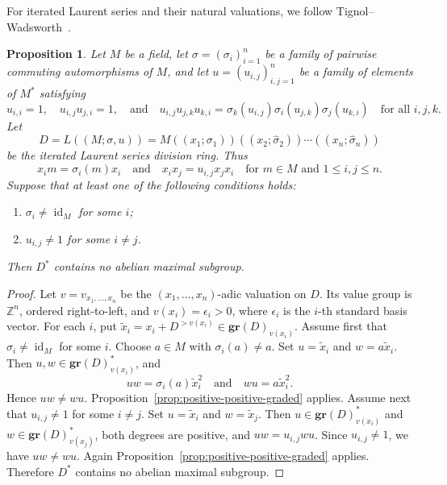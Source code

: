 \documentclass[11pt]{amsart}
\newtheorem{proposition}[theorem]{Proposition}
\theoremstyle{definition}
\begin{document}
For iterated Laurent series and their natural valuations, we follow
Tignol--Wadsworth~\cite[§1.1.3, pp.~5--7]{TW}.

\begin{proposition}
\label{prop:iterated-laurent}
Let $M$ be a field, let $\sigma=(\sigma_i)^n_{i=1}$ be a family of pairwise
commuting automorphisms of $M$, and let $u=(u_{i,j})^n_{i,j=1}$ be a family
of elements of $M^*$ satisfying
$$
        u_{i,i}=1,\quad u_{i,j}u_{j,i}=1,\quad\text{and}\quad
        u_{i,j}u_{j,k}u_{k,i}
        =
        \sigma_k(u_{i,j})\sigma_i(u_{j,k})\sigma_j(u_{k,i})
        \quad\text{for all } i,j,k.
$$
Let
\[
        D=L((M;\sigma,u))
        =
        M((x_1;\sigma_1))((x_2;\widehat\sigma_2))\cdots
        ((x_n;\widehat\sigma_n))
\]
be the iterated Laurent series division ring.  Thus
$$
        x_i m=\sigma_i(m)x_i\quad\text{and}\quad x_i x_j=u_{i,j}x_jx_i
        \quad\text{for } m\in M \text{ and } 1\leq i,j\leq n.
$$  Suppose that at least one of the
following conditions holds:
\begin{enumerate}[label=\textup{(\arabic*)}]
        \item $\sigma_i\ne\operatorname{id}_M$ for some $i$;
        \item $u_{i,j}\ne 1$ for some $i\ne j$.
\end{enumerate}
Then $D^*$ contains no abelian maximal subgroup.
\end{proposition}

\begin{proof}
Let $v=v_{x_1,\ldots,x_n}$ be the $(x_1,\ldots,x_n)$-adic valuation on $D$.
Its value group is $\mathbb Z^n$, ordered right-to-left, and
$v(x_i)=\epsilon_i>0$, where $\epsilon_i$ is the $i$-th standard basis vector.
For each $i$, put
$\widetilde x_i=x_i+D^{>v(x_i)}\in \mathbf{gr}(D)_{v(x_i)}$.
Assume first that $\sigma_i\ne\operatorname{id}_M$ for some $i$. Choose
$a\in M$ with $\sigma_i(a)\ne a$. Set $u=\widetilde x_i$ and
$w=a\widetilde x_i$. Then $u,w\in \mathbf{gr}(D)_{v(x_i)}^*$, and
\[
        uw=\sigma_i(a)\widetilde x_i^2
        \quad\text{and}\quad
        wu=a\widetilde x_i^2.
\]
Hence $uw\ne wu$. Proposition~\ref{prop:positive-positive-graded} applies.
Assume next that $u_{i,j}\ne 1$ for some $i\ne j$. Set
$u=\widetilde x_i$ and $w=\widetilde x_j$. Then
$u\in \mathbf{gr}(D)_{v(x_i)}^*$ and
$w\in \mathbf{gr}(D)_{v(x_j)}^*$, both degrees are positive, and $uw=u_{i,j}wu$. Since $u_{i,j}\ne 1$, we have $uw\ne wu$. Again
Proposition~\ref{prop:positive-positive-graded} applies. Therefore $D^*$
contains no abelian maximal subgroup.
\end{proof}
\end{document}

